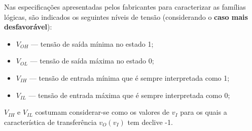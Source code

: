 \newpage
\noindent Nas especificações apresentadas pelos fabricantes para caracterizar as famílias lógicas, são indicados os seguintes níveis de tensão (considerando o \textbf{caso mais desfavorável}):

\begin{itemize}[leftmargin=*, label=]
    \item $V_{OH}$ --- tensão de saída mínima no estado 1;
    \item $V_{OL}$ --- tensão de saída máxima no estado 0;
    \item $V_{IH}$ --- tensão de entrada mínima que é sempre interpretada como 1;
    \item $V_{IL}$ --- tensão de entrada máxima que é sempre interpretada como 0;
\end{itemize}

\noindent $V_{IH}$ e $V_{IL}$ costumam considerar-se como os valores de $v_I$ para os quais a característica de transferência $v_O(v_I)$ tem declive -1.

